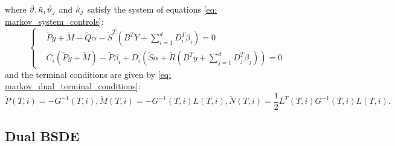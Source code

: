 where $\tilde{\vartheta}, \Tilde{\kappa}, \Tilde{\vartheta}_j$ and $\Tilde{\kappa}_j$ satisfy the system of equations \eqref{eq: markov_system_controls}:
\begin{equation*}
\begin{cases}
    &\tilde{P}y + \tilde{M} - \tilde{Q}\alpha - \tilde{S}^T (B^T Y + \sum_{i=1}^d D_i^T \beta_i) = 0\\
    &C_i (\tilde{P}y + \tilde{M}) - \tilde{P} \beta_i
    + D_i (\tilde{S}\alpha + \tilde{R}(B^T y + \sum_{j=1}^d D_j^T \beta_j)) = 0
\end{cases}
\end{equation*}
and the terminal conditions are given by \eqref{eq: markov_dual_terminal_conditions}:
\begin{equation}
    \tilde{P}(T,i) = -G^{-1}(T,i),  \tilde{M}(T,i) = - G^{-1}(T,i)L(T,i),  \tilde{N}(T,i) = \frac12 L^T(T,i)G^{-1}(T,i)L(T,i). \label{eq: markov_dual_hjb_terminal_conditions}
\end{equation}
\newpage
\subsection{Dual BSDE}
